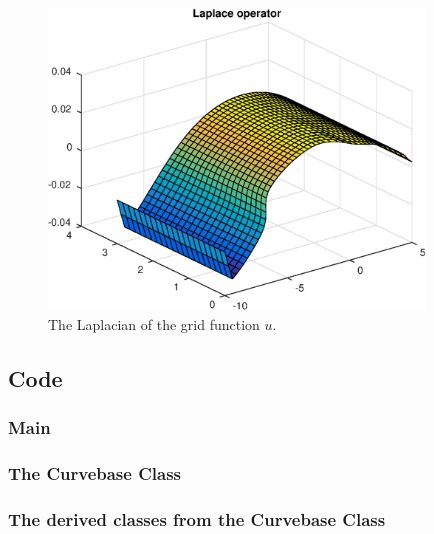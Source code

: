 \documentclass[a4paper,10pt]{article}
\begin{document}
\begin{figure}[ht]
  \centering
  \includegraphics[width = 10cm, height = 8cm]{Laplace}
  \begin{minipage}[t]{100mm}
    \caption{
      The Laplacian of the grid function $u$.
    }\label{FIG_jjj}
  \end{minipage}
\end{figure}







\FloatBarrier
\newpage
\subsection*{Code}
\subsubsection*{Main}

\subsubsection*{The Curvebase Class}


\subsubsection*{The derived classes from the Curvebase Class}

%

%


\end{document}
